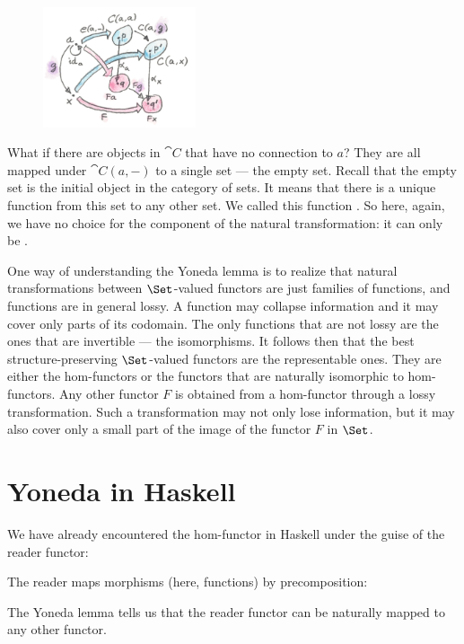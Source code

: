 \begin{figure}[H]
\centering
\includegraphics[width=0.4\textwidth]{images/yoneda5.png}
\end{figure}

\noindent
What if there are objects in $\cat{C}$ that have no connection to
$a$? They are all mapped under $\cat{C}(a, -)$ to a single set
--- the empty set. Recall that the empty set is the initial object in
the category of sets. It means that there is a unique function from this
set to any other set. We called this function . So here,
again, we have no choice for the component of the natural
transformation: it can only be .

One way of understanding the Yoneda lemma is to realize that natural
transformations between $\Set$-valued functors are just families
of functions, and functions are in general lossy. A function may
collapse information and it may cover only parts of its codomain. The
only functions that are not lossy are the ones that are invertible ---
the isomorphisms. It follows then that the best structure-preserving
$\Set$-valued functors are the representable ones. They are either
the hom-functors or the functors that are naturally isomorphic to
hom-functors. Any other functor $F$ is obtained from a
hom-functor through a lossy transformation. Such a transformation may
not only lose information, but it may also cover only a small part of
the image of the functor $F$ in $\Set$.

\section{Yoneda in Haskell}

We have already encountered the hom-functor in Haskell under the guise
of the reader functor:

The reader maps morphisms (here, functions) by precomposition:

The Yoneda lemma tells us that the reader functor can be naturally
mapped to any other functor.


